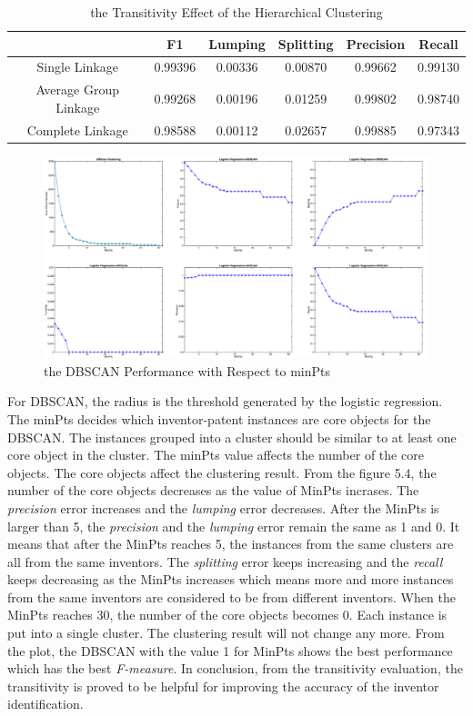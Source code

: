\begin{table}
\centering
\begin{tabular}{|c|c|c|c|c|c|}
\hline
&F1&Lumping&Splitting&Precision&Recall\\
\hline
Single Linkage& 0.99396&0.00336 &0.00870 &0.99662 &0.99130 \\
\hline
Average Group Linkage&0.99268 &0.00196 & 0.01259& 0.99802& 0.98740\\
\hline
Complete Linkage&0.98588 & 0.00112 & 0.02657 &0.99885 &0.97343 \\
\hline
\end{tabular}
\caption{the Transitivity Effect of the Hierarchical Clustering}
\end{table}
\begin{figure}
\centering
\includegraphics[scale=0.2]{DBSCANT.pdf}
\caption{the DBSCAN Performance with Respect to minPts}
\end{figure}

For DBSCAN, the radius is the threshold generated by the logistic regression. The minPts decides which inventor-patent instances are core objects for the DBSCAN. The instances grouped into a cluster should be similar to at least one core object in the cluster. The minPts value affects the number of the core objects. The core objects affect the clustering result. From the figure 5.4, the number of the core objects decreases as the value of MinPts incrases. The \emph{precision} error increases and the \emph{lumping} error decreases. After the MinPts is larger than 5, the \emph{precision} and the \emph{lumping} error remain the same as 1 and 0. It means that after the MinPts reaches 5, the instances from the same clusters are all from the same inventors. The \emph{splitting} error keeps increasing and the \emph{recall} keeps decreasing as the MinPts increases which means more and more instances from the same inventors are considered to be from different inventors. When the MinPts reaches 30, the number of the core objects becomes 0. Each instance is put into a single cluster. The clustering result will not change any more. From the plot, the DBSCAN with the value 1 for MinPts shows the best performance which has the best \emph{F-measure}. In conclusion, from the transitivity evaluation, the transitivity is proved to be helpful for improving the accuracy of the inventor identification.

